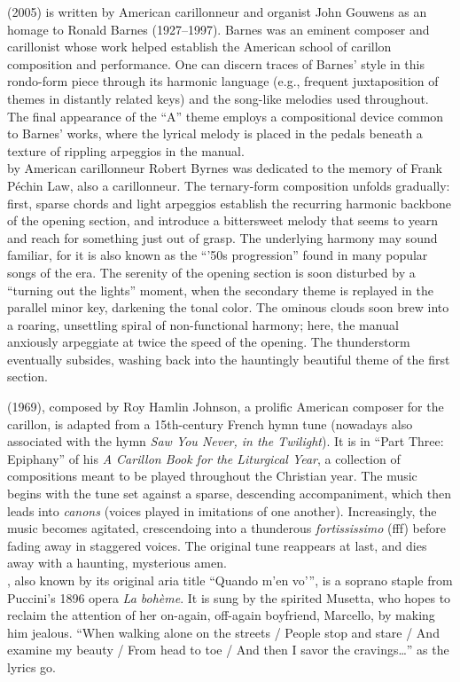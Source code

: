 \documentclass[11pt, letterpaper]{article}
\begin{document}
\begin{small}
     (2005) is written by American carillonneur and organist John Gouwens as an homage to Ronald Barnes (1927–1997). Barnes was an eminent composer and carillonist whose work helped establish the American school of carillon composition and performance. One can discern traces of Barnes' style in this rondo-form piece through its harmonic language (e.g., frequent juxtaposition of themes in distantly related keys) and the song-like melodies used throughout. The final appearance of the ``A'' theme employs a compositional device common to Barnes' works, where the lyrical melody is placed in the pedals beneath a texture of rippling arpeggios in the manual.\\[.2em]
     by American carillonneur Robert Byrnes was dedicated to the memory of Frank Péchin Law, also a carillonneur. The ternary-form composition unfolds gradually: first, sparse chords and light arpeggios establish the recurring harmonic backbone of the opening section, and introduce a bittersweet melody that seems to yearn and reach for something just out of grasp. The underlying harmony may sound familiar, for it is also known as the ``'50s progression'' found in many popular songs of the era. The serenity of the opening section is soon disturbed by a ``turning out the lights'' moment, when the secondary theme is replayed in the parallel minor key, darkening the tonal color. The ominous clouds soon brew into a roaring, unsettling spiral of non-functional harmony; here, the manual anxiously arpeggiate at twice the speed of the opening. The thunderstorm eventually subsides, washing back into the hauntingly beautiful theme of the first section.

    \divider

     (1969), composed by Roy Hamlin Johnson, a prolific American composer for the carillon, is adapted from a 15th-century French hymn tune (nowadays also associated with the hymn \emph{Saw You Never, in the Twilight}). It is in ``Part Three: Epiphany'' of his \emph{A Carillon Book for the Liturgical Year}, a collection of compositions meant to be played throughout the Christian year. The music begins with the tune set against a sparse, descending accompaniment, which then leads into \emph{canons} (voices played in imitations of one another). Increasingly, the music becomes agitated, crescendoing into a thunderous \emph{fortississimo} (fff) before fading away in staggered voices. The original tune reappears at last, and dies away with a haunting, mysterious amen.\\[.2em]
    , also known by its original aria title \enquote{Quando m'en vo'}, is a soprano staple from Puccini's 1896 opera \emph{La bohème}. It is sung by the spirited Musetta, who hopes to reclaim the attention of her on-again, off-again boyfriend, Marcello, by making him jealous. ``When walking alone on the streets / People stop and stare / And examine my beauty / From head to toe / And then I savor the cravings…'' as the lyrics go.


\end{small}
\end{document}
